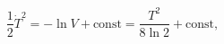 \begin{equation}\label{teqn}
\frac12\dot{T}^2 = -\ln V + \mbox{const} = \frac{T^2}{8\ln2} + \mbox{const},
\end{equation}

